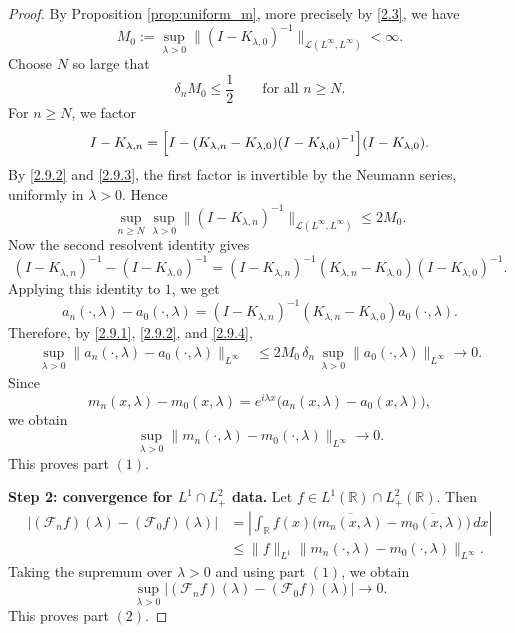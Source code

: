 \documentclass[10pt]{article}
\numberwithin{equation}{section}
\numberwithin{theorem}{section}
\begin{document}
\begin{proof}
By Proposition \ref{prop:uniform_m}, more precisely by \eqref{2.3}, we have
\begin{equation}
\label{2.9.2}
M_0:=
\sup_{\lambda>0}
\|(I-K_{\lambda,0})^{-1}\|_{\mathcal L(L^\infty,L^\infty)}
<\infty .
\end{equation}
Choose \(N\) so large that
\begin{equation}
\label{2.9.3}
\delta_nM_0\le \frac12
\qquad\text{for all }n\ge N.
\end{equation}
For \(n\ge N\), we factor
\[
I-K_{\lambda,n}
=
\Bigl[
I-(K_{\lambda,n}-K_{\lambda,0})(I-K_{\lambda,0})^{-1}
\Bigr](I-K_{\lambda,0}).
\]
By \eqref{2.9.2} and \eqref{2.9.3}, the first factor is invertible by the Neumann
series, uniformly in \(\lambda>0\). Hence
\begin{equation}
\label{2.9.4}
\sup_{n\ge N}\sup_{\lambda>0}
\|(I-K_{\lambda,n})^{-1}\|_{\mathcal L(L^\infty,L^\infty)}
\le 2M_0 .
\end{equation}
Now the second resolvent identity gives
\[
(I-K_{\lambda,n})^{-1}-(I-K_{\lambda,0})^{-1}
=
(I-K_{\lambda,n})^{-1}
(K_{\lambda,n}-K_{\lambda,0})
(I-K_{\lambda,0})^{-1}.
\]
Applying this identity to \(1\), we get
\[
a_n(\cdot,\lambda)-a_0(\cdot,\lambda)
=
(I-K_{\lambda,n})^{-1}
(K_{\lambda,n}-K_{\lambda,0})
a_0(\cdot,\lambda).
\]
Therefore, by \eqref{2.9.1}, \eqref{2.9.2}, and \eqref{2.9.4},
\begin{equation}
\label{2.9.5}
\begin{aligned}
\sup_{\lambda>0}
\|a_n(\cdot,\lambda)-a_0(\cdot,\lambda)\|_{L^\infty}
&\le
2M_0\,\delta_n\,
\sup_{\lambda>0}\|a_0(\cdot,\lambda)\|_{L^\infty}
\longrightarrow0 .
\end{aligned}
\end{equation}
Since
\[
m_n(x,\lambda)-m_0(x,\lambda)
=
e^{i\lambda x}
\bigl(a_n(x,\lambda)-a_0(x,\lambda)\bigr),
\]
we obtain
\[
\sup_{\lambda>0}
\|m_n(\cdot,\lambda)-m_0(\cdot,\lambda)\|_{L^\infty}
\to0.
\]
This proves part \((1)\).

\medskip
\noindent\textbf{Step 2: convergence for \(L^1\cap L^2_+\) data.}
Let \(f\in L^1(\mathbb R)\cap L^2_+(\mathbb R)\). Then
\[
\begin{aligned}
|(\mathcal F_nf)(\lambda)-(\mathcal F_0f)(\lambda)|
&=
\left|
\int_{\mathbb R}
f(x)\bigl(\overline{m_n(x,\lambda)}-\overline{m_0(x,\lambda)}\bigr)\,dx
\right|  \\
&\le
\|f\|_{L^1}
\|m_n(\cdot,\lambda)-m_0(\cdot,\lambda)\|_{L^\infty}.
\end{aligned}
\]
Taking the supremum over \(\lambda>0\) and using part \((1)\), we obtain
\[
\sup_{\lambda>0}
|(\mathcal F_nf)(\lambda)-(\mathcal F_0f)(\lambda)|
\to0.
\]
This proves part \((2)\).


\end{proof}
\end{document}
